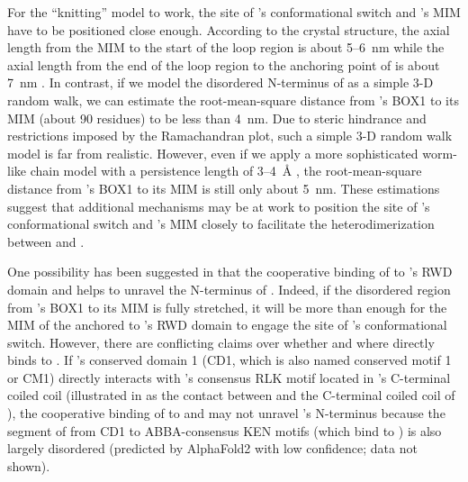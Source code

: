 For the ``knitting'' model to work, the site of 's conformational switch and 's MIM have to be positioned close enough. According to the crystal structure, the axial length from the MIM to the start of the loop region is about 5--\SI{6}{nm} while the axial length from the end of the loop region to the anchoring point of  is about \SI{7}{nm} \cite{TemplateModel, Ji2017eLife, BUB1-CDC20-MAD1, Structure1GO4, Structure4DZO}. In contrast, if we model the disordered N-terminus of  as a simple 3-D random walk, we can estimate the root-mean-square distance from 's BOX1 to its MIM (about 90 residues) to be less than \SI{4}{nm}. Due to steric hindrance and restrictions imposed by the Ramachandran plot, such a simple 3-D random walk model is far from realistic. However, even if we apply a more sophisticated worm-like chain model with a persistence length of 3--\SI{4}{\r{A}} \cite{RandomWalk3D-WormLikeChain}, the root-mean-square distance from 's BOX1 to its MIM is still only about \SI{5}{nm}. These estimations suggest that additional mechanisms may be at work to position the site of 's conformational switch and 's MIM closely to facilitate the heterodimerization between  and .

One possibility has been suggested in \cite{BUB1-CDC20-MAD1, Tripartite} that the cooperative binding of  to 's RWD domain and  helps to unravel the N-terminus of . Indeed, if the disordered region from 's BOX1 to its MIM is fully stretched, it will be more than enough for the MIM of the  anchored to 's RWD domain to engage the site of 's conformational switch. However, there are conflicting claims over whether and where  directly binds to  \cite{Ji2017eLife, BUB1-CDC20-MAD1, BUB1CD1-MAD1CStructure}. If 's conserved domain 1 (CD1, which is also named conserved motif 1 or CM1) directly interacts with 's consensus RLK motif located in 's C-terminal coiled coil \cite{Ji2017eLife, BUB1CD1-MAD1CStructure} (illustrated in  as the contact between  and the C-terminal coiled coil of ), the cooperative binding of  to  and  may not unravel 's N-terminus because the segment of  from CD1 to ABBA-consensus KEN motifs (which bind to  \cite{BUB1-CDC20-MAD1, CDC20-KEN, ABBA}) is also largely disordered (predicted by AlphaFold2 with low confidence; data not shown).


